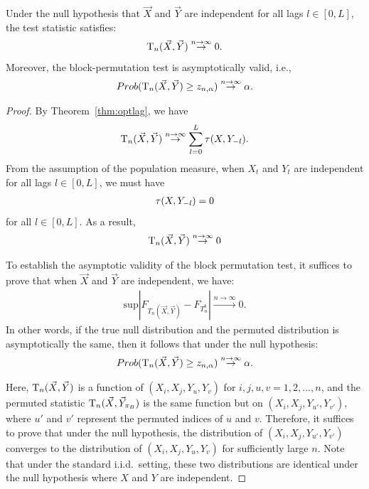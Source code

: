 \begin{theorem}
    Under the null hypothesis that $\vec{X}$ and $\vec{Y}$ are independent for all lags $l \in [0,L]$, the test statistic satisfies:
    \begin{align*}
       \mathrm{T}_{n}(\vec{X}, \vec{Y}) \stackrel{n\rightarrow \infty}{\rightarrow} 0.
       \end{align*}
    Moreover, the block-permutation test is asymptotically valid, i.e., 
    \begin{align*}
       Prob(\mathrm{T}_{n}(\vec{X}, \vec{Y}) \geq z_{n,\alpha}) \stackrel{n\rightarrow \infty}{\rightarrow} \alpha.
       \end{align*}
\end{theorem}
\begin{proof}
By Theorem~\ref{thm:optlag}, we have
\begin{align*}
\mathrm{T}_{n}(\vec{X}, \vec{Y}) \stackrel{n \rightarrow \infty}{\rightarrow} \sum_{l=0}^{L}\tau(X, Y_{-l}).
\end{align*}
From the assumption of the population measure, when $X_t$ and $Y_t$ are independent for all lags $l \in [0,L]$, we must have
\begin{align*}
\tau(X, Y_{-l}) =0
\end{align*}
for all $l \in [0,L]$. As a result, 
\begin{align*}
\mathrm{T}_{n}(\vec{X}, \vec{Y}) \stackrel{n \rightarrow \infty}{\rightarrow}  0
\end{align*}

To establish the asymptotic validity of the block permutation test, it suffices to prove that when $\vec{X}$ and $\vec{Y}$ are independent, we have:
\begin{align*}
\mbox{sup} |F_{T_{n}(\vec{X}, \vec{Y})} - F_{T_{n}^{b}} | \stackrel{n\rightarrow \infty}{\rightarrow} 0.
\end{align*}
In other words, if the true null distribution and the permuted distribution is asymptotically the same, then it follows that under the null hypothesis:
\begin{align*}
       Prob(\mathrm{T}_{n}(\vec{X}, \vec{Y}) \geq z_{n,\alpha}) \stackrel{n\rightarrow \infty}{\rightarrow} \alpha.
       \end{align*}

Here, $\mathrm{T}_{n}(\vec{X},\vec{Y})$ is a function of $(X_i,X_j, Y_u,Y_v)$ for $i,j,u,v=1,2,\ldots,n$, and the permuted statistic $\mathrm{T}_{n}(\vec{X},\vec{Y}_{\pi_{B}})$ is the same function but on $(X_i,X_j, Y_{u'},Y_{v'})$, where $u'$ and $v'$ represent the permuted indices of $u$ and $v$. Therefore, it suffices to prove that under the null hypothesis, the distribution of $(X_i,X_j, Y_{u'},Y_{v'})$ converges to the distribution of $(X_i,X_j, Y_u,Y_v)$ for sufficiently large $n$. Note that under the standard i.i.d.~setting, these two distributions are identical under the null hypothesis where $X$ and $Y$ are independent.


\end{proof}
